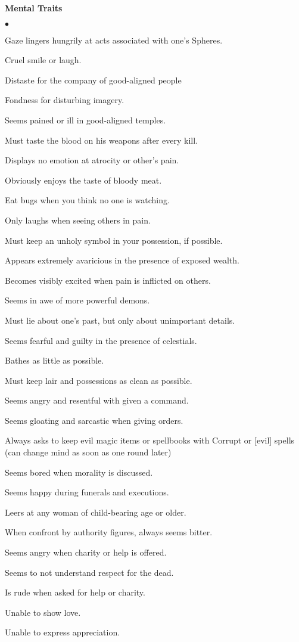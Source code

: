 \textbf{Mental Traits}
\begin{small}
\begin{list}{$\bullet$}{\itemspace}
\item Gaze lingers hungrily at acts associated with one's Spheres.
\item Cruel smile or laugh.
\item Distaste for the company of good-aligned people
\item Fondness for disturbing imagery.
\item Seems pained or ill in good-aligned temples.
\item Must taste the blood on his weapons after every kill.
\item Displays no emotion at atrocity or other's pain.
\item Obviously enjoys the taste of bloody meat.
\item Eat bugs when you think no one is watching.
\item Only laughs when seeing others in pain.
\item Must keep an unholy symbol in your possession, if possible.
\item Appears extremely avaricious in the presence of exposed wealth.
\item Becomes visibly excited when pain is inflicted on others.
\item Seems in awe of more powerful demons.
\item Must lie about one's past, but only about unimportant details.
\item Seems fearful and guilty in the presence of celestials.
\item Bathes as little as possible.
\item Must keep lair and possessions as clean as possible.
\item Seems angry and resentful with given a command.
\item Seems gloating and sarcastic when giving orders.
\item Always asks to keep evil magic items or spellbooks with Corrupt or [evil] spells (can change mind as soon as one round later)
\item Seems bored when morality is discussed.
\item Seems happy during funerals and executions.
\item Leers at any woman of child-bearing age or older.
\item When confront by authority figures, always seems bitter.
\item Seems angry when charity or help is offered.
\item Seems to not understand respect for the dead.
\item Is rude when asked for help or charity.
\item Unable to show love.
\item Unable to express appreciation.
\end{list}\end{small}
